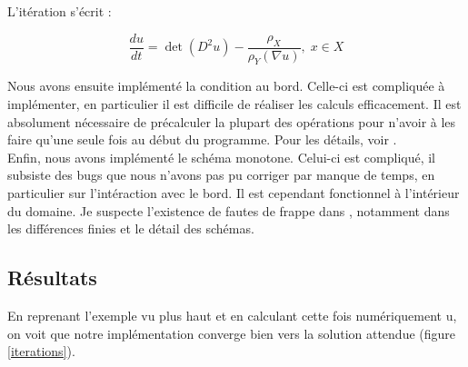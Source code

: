 \documentclass[12pt,a4paper,twoside]{article}
\begin{document}
L'itération s'écrit :

\begin{equation}
\displaystyle \frac{du}{dt} = \det(D^2 u) - \frac{\rho_X}{\rho_Y(\nabla u)}, \; x \in X
\end{equation}


Nous avons ensuite implémenté la condition au bord. Celle-ci est compliquée à implémenter, en particulier
il est difficile de réaliser les calculs efficacement. Il est absolument nécessaire de précalculer la plupart
des opérations  pour n'avoir à les faire qu'une seule fois au début du programme. Pour les détails, voir \cite{benamou2014numerical}.  \\

Enfin, nous avons implémenté le schéma monotone. Celui-ci est compliqué, il subsiste des bugs que nous n'avons pas
pu corriger par manque de temps, en particulier
sur l'intéraction avec le bord. Il est cependant fonctionnel à l'intérieur du domaine. Je suspecte l'existence de
fautes de frappe dans \cite{benamou2014numerical}, notamment dans les différences finies et le détail des schémas.

\subsection{Résultats}

En reprenant l'exemple vu plus haut et en calculant cette fois numériquement u, on voit que notre implémentation
converge bien vers la solution attendue (figure \ref{iterations}).
\end{document}
